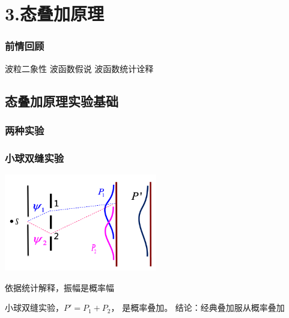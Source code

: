 \section{3.态叠加原理}

\begin{frame}
    \frametitle{前情回顾}
    \begin{itemize}
        \Item 波粒二象性
        \Item 波函数假说
        \Item 波函数统计诠释
    \end{itemize}
\end{frame}  

\subsection{态叠加原理实验基础}

\begin{frame}
    \frametitle{两种实验}
        \begin{figure}
            \centering
        \end{figure}
    \setcounter{subfigure}{0}
\end{frame}

\begin{frame}
    \frametitle{小球双缝实验}
    \begin{center}
        \includegraphics[width=0.5\textwidth]{figs/sup-2.png} \\
    \end{center} 
    依据统计解释，振幅是概率幅\\
    \begin{itemize}
        \Item 小球双缝实验，$P'=P_1+P_2 $， 是概率叠加。
        \Item 结论：经典叠加服从概率叠加
    \end{itemize}
\end{frame} 


